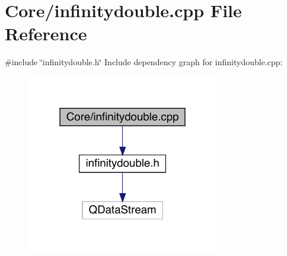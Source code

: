 \hypertarget{a00056}{}\section{Core/infinitydouble.cpp File Reference}
\label{a00056}
{\ttfamily \#include \char`\"{}infinitydouble.\+h\char`\"{}}\newline
Include dependency graph for infinitydouble.\+cpp\+:
\nopagebreak
\begin{figure}[H]
\begin{center}
\leavevmode
\includegraphics[width=238pt]{d1/d22/a00057}
\end{center}
\end{figure}
